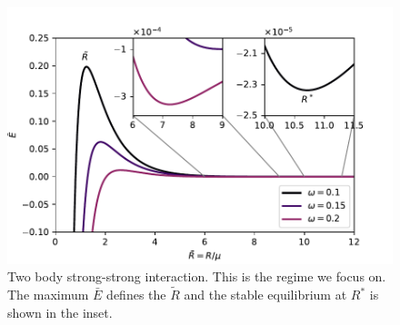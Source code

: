 \begin{figure}[h]
\centering
\includegraphics[width=12cm]{figures/3-elastic-figs/Epi2pi2_multiple_w.pdf}
\caption{Two body strong-strong interaction. This is the regime we focus on. The maximum $\bar{E}$ defines the $\tilde{R}$ and the stable equilibrium at $R^*$ is shown in the inset.}
\label{fig:ss}
\end{figure}
